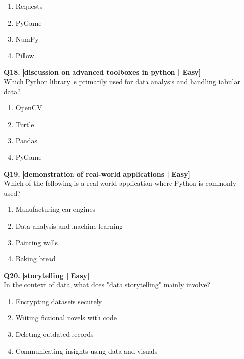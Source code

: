\begin{enumerate}[label=(\alph*),topsep=2pt,itemsep=1pt,partopsep=0pt,parsep=0pt]
    \item \relax Requests
    \item \relax PyGame
    \item \relax NumPy
    \item \relax Pillow
\end{enumerate}
\vspace{2mm}

\noindent\textbf{Q18.} \hfill {\small\color{LPUOrange}\textbf{[discussion on advanced toolboxes in python | Easy]}}\\[2pt]
Which Python library is primarily used for data analysis and handling tabular data?

\begin{enumerate}[label=(\alph*),topsep=2pt,itemsep=1pt,partopsep=0pt,parsep=0pt]
    \item \relax OpenCV
    \item \relax Turtle
    \item \relax Pandas
    \item \relax PyGame
\end{enumerate}
\vspace{2mm}

\noindent\textbf{Q19.} \hfill {\small\color{LPUOrange}\textbf{[demonstration of real-world applications | Easy]}}\\[2pt]
Which of the following is a real-world application where Python is commonly used?

\begin{enumerate}[label=(\alph*),topsep=2pt,itemsep=1pt,partopsep=0pt,parsep=0pt]
    \item \relax Manufacturing car engines
    \item \relax Data analysis and machine learning
    \item \relax Painting walls
    \item \relax Baking bread
\end{enumerate}
\vspace{2mm}

\noindent\textbf{Q20.} \hfill {\small\color{LPUOrange}\textbf{[storytelling | Easy]}}\\[2pt]
In the context of data, what does "data storytelling" mainly involve?

\begin{enumerate}[label=(\alph*),topsep=2pt,itemsep=1pt,partopsep=0pt,parsep=0pt]
    \item \relax Encrypting datasets securely
    \item \relax Writing fictional novels with code
    \item \relax Deleting outdated records
    \item \relax Communicating insights using data and visuals
\end{enumerate}
\vspace{2mm}

